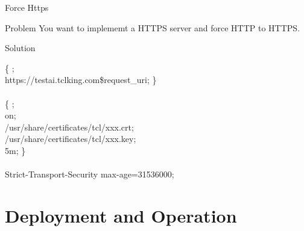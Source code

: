 \documentclass{beamer}
\begin{document}
\begin{frame}{Force Https}

\scriptsize
\begin{block}{Problem}
	You want to implememt a HTTPS server and force HTTP to HTTPS.
\end{block}


\begin{block}{Solution}
\vspace{0.01\textheight}
\begin{Alms*}
	  \{ \NI
	 ; \\
	  https://testai.tclking.com\$request\_uri;
	\ND \}
	\\
	\\
	  \{ \NI
	 ; \\
	          on; \\
	     /usr/share/certificates/tcl/xxx.crt; \\
	  /usr/share/certificates/tcl/xxx.key; \\
	
	  5m;
	\ND \}
	\\
	\\
	 Strict-Transport-Security max-age=31536000;
\end{Alms*}
\end{block}
	
\end{frame}



\section{Deployment and Operation}
\end{document}
